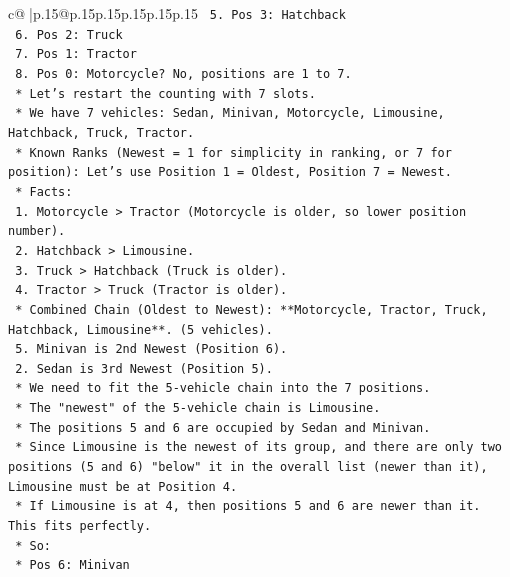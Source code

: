 \documentclass{article}
\begin{document}
{\begin{supertabular}{c@{$\;$}|p{.15\linewidth}@{}p{.15\linewidth}p{.15\linewidth}p{.15\linewidth}p{.15\linewidth}p{.15\linewidth}}
{{{\texttt{                5.  Pos 3: Hatchback} \\
\texttt{                6.  Pos 2: Truck} \\
\texttt{                7.  Pos 1: Tractor} \\
\texttt{                8.  Pos 0: Motorcycle? No, positions are 1 to 7.} \\
\texttt{            *   Let's restart the counting with 7 slots.} \\
\texttt{            *   We have 7 vehicles: Sedan, Minivan, Motorcycle, Limousine, Hatchback, Truck, Tractor.} \\
\texttt{            *   Known Ranks (Newest = 1 for simplicity in ranking, or 7 for position): Let's use Position 1 = Oldest, Position 7 = Newest.} \\
\texttt{            *   Facts:} \\
\texttt{                1.  Motorcycle > Tractor (Motorcycle is older, so lower position number).} \\
\texttt{                2.  Hatchback > Limousine.} \\
\texttt{                3.  Truck > Hatchback (Truck is older).} \\
\texttt{                4.  Tractor > Truck (Tractor is older).} \\
\texttt{                *   Combined Chain (Oldest to Newest): **Motorcycle, Tractor, Truck, Hatchback, Limousine**. (5 vehicles).} \\
\texttt{                5.  Minivan is 2nd Newest (Position 6).} \\
\texttt{                2.  Sedan is 3rd Newest (Position 5).} \\
\texttt{            *   We need to fit the 5{-}vehicle chain into the 7 positions.} \\
\texttt{            *   The "newest" of the 5{-}vehicle chain is Limousine.} \\
\texttt{            *   The positions 5 and 6 are occupied by Sedan and Minivan.} \\
\texttt{            *   Since Limousine is the newest of its group, and there are only two positions (5 and 6) "below" it in the overall list (newer than it), Limousine must be at Position 4.} \\
\texttt{            *   If Limousine is at 4, then positions 5 and 6 are newer than it. This fits perfectly.} \\
\texttt{            *   So:} \\
\texttt{                *   Pos 6: Minivan} \\
}}}
\end{supertabular}}
\end{document}
